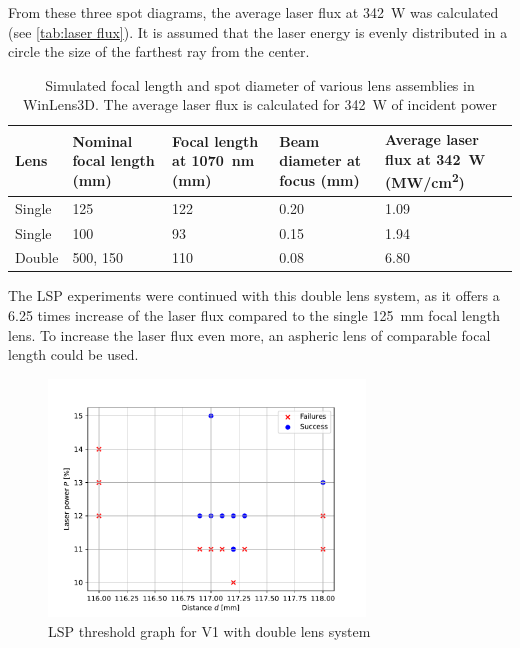             From these three spot diagrams, the average laser flux at \qtylist{342}{W} was calculated (see \autoref{tab:laser flux}). It is assumed that the laser energy is evenly distributed in a circle the size of the farthest ray from the center.
            \begin{table}[!ht]
                \centering
                \caption{Simulated focal length and spot diameter of various lens assemblies in WinLens3D. The average laser flux is calculated for \qty{342}{W} of incident power}
                \label{tab:laser flux}
                \begin{tabularx}{\textwidth}{@{}lX<{\raggedright}X<{\raggedright}X<{\raggedright}X<{\raggedright}@{}}
                \toprule
                Lens & Nominal focal length (\unit{mm}) & Focal length at \qty{1070}{nm} (\unit{mm})& Beam diameter at focus (\unit{mm}) & Average laser flux at \qty{342}{W} (\unit{MW/cm^2}) \\ \midrule
                Single & 125           &  122  &    0.20   &  1.09 \\
                Single & 100           &  93   &    0.15   &  1.94 \\
                Double & 500, 150      &  110  &    0.08   &  6.80 \\ %
                \bottomrule
                \end{tabularx}
            \end{table}
            The LSP experiments were continued with this double lens system, as it offers a 6.25 times increase of the laser flux compared to the single \qtylist{125}{mm} focal length lens. To increase the laser flux even more, an aspheric lens of comparable focal length could be used.

            \begin{figure}[!ht]
                \centering
                \includegraphics[width=0.75\textwidth]{assets/4 experiments/duallens_focus_threshold.pdf}
                \caption{LSP threshold graph for V1 with double lens system}
            \end{figure}
            
